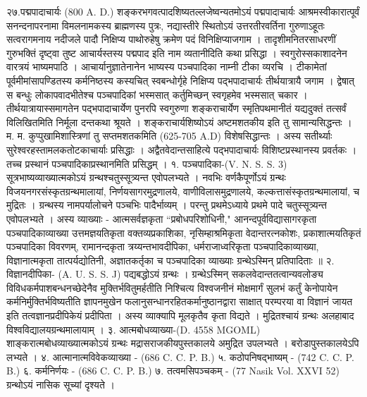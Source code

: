 २७.पद्मपादाचार्यः (800 A. D.)
शङ्करभगवत्पादशिष्यतल्लजेष्वन्यतमोऽयं पद्मपादाचार्यः आश्रमस्वीकारात्पूर्वं सनन्दनापरनामा विमलनामकस्य ब्राह्मणस्य पुत्रः, नद्यास्तीरे स्थितोऽयं उत्तरतीरवर्तिना गुरुणाऽहूतः सत्वरागमनाय नदीजले पादौ निक्षिप्य पाथोरुहेषु क्रमेण पदं विनिक्षिप्याजगाम । तादृशीमनितरसाधरणीं गुरुभक्तिं दृष्ट्वा तुष्ट आचार्यस्तस्य पद्मपाद इति नाम व्यतानीदिति कथा प्रसिद्धा । स्वगुरोस्सकाशादनेन वारत्रयं भाष्यमपाठि । आचार्यानुज्ञातेनानेन भाष्यस्य पञ्चपादिका नाम्नी टीका व्यरचि ।
टीकामेतां पूर्वमीमांसापण्डितस्य कर्मनिष्ठस्य कस्यचित् स्वबन्धोर्गृहे निक्षिप्य पद्भपादाचार्यः तीर्थयात्रायै जगाम । द्वेषात् स बन्धुः लोकापवादभीतेश्च पञ्चपादिकां भस्मसात् कर्तुमिच्छन् स्वगृहमेव भस्मसात् चकार । तीर्थयात्रायास्समागतेन पद्भपादाचार्येण पुनरपि स्वगुरुणा शङ्कराचार्येण स्मृतिपथमानीतं यद्यदुक्तं तत्सर्वं विलिखितमिति निर्मूला दन्तकथा श्रूयते ।
शङ्कराचार्यशिष्योऽयं अष्टमशतकीय इति तु सामान्यसिद्धन्तः । म. म. कुप्पुखामिशास्त्रिणां तु सप्तमशतकमिति (625-705 A.D) विशेषसिद्धान्तः । अस्य सतीर्थ्याः सुरेश्वरहस्तामलकतोटकाचार्याः प्रसिद्धाः । अद्वैतवेदान्तसाहित्ये पद्भपादाचार्यः विशिष्टप्रस्थानस्य प्रवर्तकः । तच्च प्रस्थानं पञ्चपादिकाप्रस्थानमिति प्रसिद्धम् ।
१. पञ्चपादिका-(V. N. S. S. 3)
सूत्रभाष्यव्याख्यात्मकोऽयं ग्रन्थश्चतुस्सूत्र्यन्त एवोपलभ्यते । नवभिः वर्णकैपूर्णोऽयं ग्रन्थः विजयनगरसंस्कृतग्रन्थमालायां, निर्णयसागरमुद्रणालये, वाणीविलासमुद्रणालये, कल्कत्तासंस्कृतग्रन्थमालायां, च मुद्रितः । ग्रन्थस्य नामपर्यालोचने पञ्चभिः पादैर्भाव्यम् । परन्तु प्रथमेऽध्याये प्रथमे पादे चतुस्सूत्र्यन्त एवोपलभ्यते । अस्य व्याख्याः - आत्मसर्वज्ञकृता ``प्रबोधपरिशोधिनी," आनन्दपूर्वविद्यासागरकृता पञ्चपादिकाव्याख्या उत्तमज्ञयतिकृता वक्तव्यप्रकाशिका, नृसिम्हाश्रमिकृता वेदान्तरत्नकोशः, प्रकाशात्मयतिकृतं पञ्चपादिका विवरणम्, रामानन्दकृता त्रय्यन्तभावदीपिका, धर्मराजाध्वरिकृता पञ्चपादिकाव्याख्या, विज्ञानात्मकृता तात्पर्यद्योतिनी, अज्ञातकर्तृका च पञ्चपादिका व्याख्याः ग्रन्थेऽस्मिन् प्रतिपादिताः ॥
२. विज्ञानदीपिका- (A. U. S. S. J)
पद्यबद्धोऽयं ग्रन्थः । ग्रन्थेऽस्मिन् सकलवेदान्ततत्वान्यवलोङ्य विविधकर्मपाशबन्धनच्छेदेनैव मुक्तिर्भवितुमर्हतीति निश्चित्य विश्वजनीनं मोक्षमार्गं सुलभं कर्तुं केनोपायेन कर्मनिर्मुक्तिर्भविष्यतीति ज्ञापनमुखेन फलानुसन्धानरहितकर्मानुष्ठानद्वारा साक्षात् परम्परया वा विज्ञानं जायत इति तत्वज्ञानप्रदीपिकेयं प्रदीपिता । अस्य व्याक्यापि मूलकृतैव कृता विद्यते । मुद्रितश्चायं ग्रन्थः अलहाबाद विश्वविद्यालयग्रन्थमालायाम् ।
३. आत्मबोधव्याख्या-(D. 4558 MGOML)
शाङ्करात्मबोधव्याख्यात्मकोऽयं ग्रन्थः मद्रासराजकीयपुस्तकालये अमुद्रित उपलभ्यते । बरोडापुस्तकालयेऽपि लभ्यते ।
४. आत्मानात्मविवेकव्याख्या - (686 C. C. P. B.)
५. कठोपनिषद्भाष्यम् - (742 C. C. P. B.)
६. कर्मनिर्णयः - (686 C. C. P. B.)
७. तत्वमसिपञ्चकम् - (77 Nasik Vol. XXVI 52) ग्रन्थोऽयं नासिक सूच्यां दृश्यते ।
